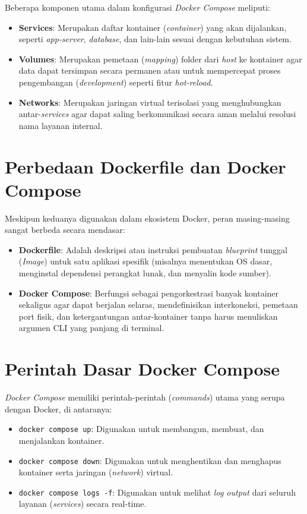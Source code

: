 \documentclass[a4paper,oneside,12pt]{report}
\begin{document}
Beberapa komponen utama dalam konfigurasi \textit{Docker Compose} meliputi:
\begin{itemize}
    \item \textbf{Services}: Merupakan daftar kontainer (\textit{container}) yang akan dijalankan, seperti \textit{app-server}, \textit{database}, dan lain-lain sesuai dengan kebutuhan sistem.
    \item \textbf{Volumes}: Merupakan pemetaan (\textit{mapping}) folder dari \textit{host} ke kontainer agar data dapat tersimpan secara permanen atau untuk mempercepat proses pengembangan (\textit{development}) seperti fitur \textit{hot-reload}.
    \item \textbf{Networks}: Merupakan jaringan virtual terisolasi yang menghubungkan antar-\textit{services} agar dapat saling berkomunikasi secara aman melalui resolusi nama layanan internal.
\end{itemize}

\section{Perbedaan Dockerfile dan Docker Compose}
Meskipun keduanya digunakan dalam ekosistem Docker, peran masing-masing sangat berbeda secara mendasar:
\begin{itemize}
    \item \textbf{Dockerfile}: Adalah deskripsi atau instruksi pembuatan \textit{blueprint} tunggal (\textit{Image}) untuk satu aplikasi spesifik (misalnya menentukan OS dasar, menginstal dependensi perangkat lunak, dan menyalin kode sumber).
    \item \textbf{Docker Compose}: Berfungsi sebagai pengorkestrasi banyak kontainer sekaligus agar dapat berjalan selaras, mendefinisikan interkoneksi, pemetaan port fisik, dan ketergantungan antar-kontainer tanpa harus menuliskan argumen CLI yang panjang di terminal.
\end{itemize}

\section{Perintah Dasar Docker Compose}
\textit{Docker Compose} memiliki perintah-perintah (\textit{commands}) utama yang serupa dengan Docker, di antaranya:
\begin{itemize}
    \item \texttt{docker compose up}: Digunakan untuk membangun, membuat, dan menjalankan kontainer.
    \item \texttt{docker compose down}: Digunakan untuk menghentikan dan menghapus kontainer serta jaringan (\textit{network}) virtual.
    \item \texttt{docker compose logs -f}: Digunakan untuk melihat \textit{log output} dari seluruh layanan (\textit{services}) secara real-time.
\end{itemize}
\end{document}
